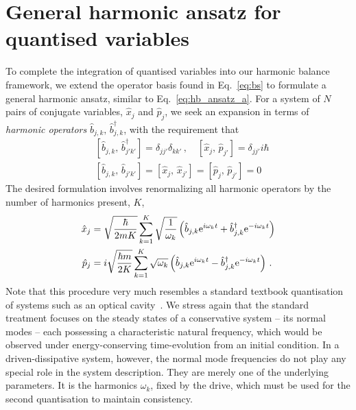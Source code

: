 \section{General harmonic ansatz for quantised variables} \label{sec:rwa_gen}

To complete the integration of quantised variables into our harmonic balance framework, we extend the operator basis found in Eq.~\eqref{eq:bs} to formulate a general harmonic ansatz, similar to Eq.~\eqref{eq:hb_ansatz_a}. For a system of $N$ pairs of conjugate variables, $\hat{x}_j$ and $\hat{p}_j$, we seek an expansion in terms of \textit{harmonic operators} $\hat{b}_{j,k} ,\, \hat{b}_{j,k}^\dagger$, with the requirement that
\begin{equation}
\begin{aligned}
&[\hat{b}_{j,k} , \, \hat{b}_{j'k'}^\dagger ] = \delta_{jj'} \delta_{kk'} \,, \quad  \left[\hat{x}_j , \, \hat{p}_{j'} \right ] = \delta_{jj'} i \hbar \\
&\left[\hat{b}_{j,k} , \, \hat{b}_{j'k'} \right] = \left[\hat{x}_j , \, \hat{x}_{j'} \right ] = \left[ \hat{p}_j ,\, \hat{p}_{j'} \right] = 0 
\end{aligned}
\end{equation}
The desired formulation involves renormalizing all harmonic operators by the number of harmonics present, $K$,
\begin{equation} \label{eq:rwa_general_ansatz}
\begin{aligned}
\hat{x}_j &= \sqrt{\frac{\hbar}{2mK}} \sum_{k=1}^K \sqrt{\frac{1}{\omega_k}} \left( \hat{b}_{j,k} {\rm e}^{i \omega_k t} + \hat{b}_{j,k}^{\dagger} {\rm e}^{-i \omega_{k} t} \right) \\
\hat{p}_j &= i\sqrt{\frac{\hbar m}{2K} } \sum_{k=1}^K \sqrt{\omega_k} \left(\hat{b}_{j,k} {\rm e}^{i \omega_k t} - \hat{b}_{j,k}^{\dagger} {\rm e}^{-i \omega_{k} t} \right) \,.
\end{aligned}
\end{equation}
Note that this procedure very much resembles a standard textbook quantisation of systems such as an optical cavity~\cite{Walls_Milburn}. We stress again that the standard treatment focuses on the steady states of a conservative system -- its normal modes -- each possessing a characteristic natural frequency, which would be observed under energy-conserving time-evolution from an initial condition. In a driven-dissipative system, however, the normal mode frequencies do not play any special role in the system description. They are merely one of the underlying parameters. It is the harmonics $\omega_k$, fixed by the drive, which must be used for the second quantisation to maintain consistency.


